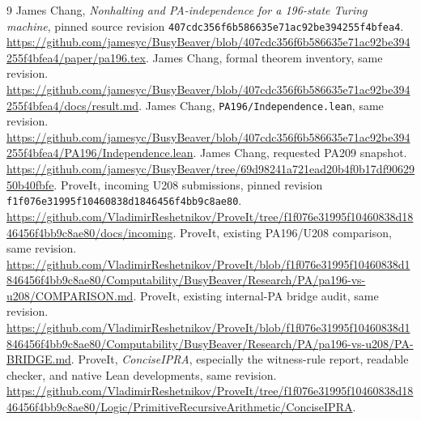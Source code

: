 \documentclass[11pt,letterpaper]{article}
\newcommand{\file}[1]{\texttt{\nolinkurl{#1}}}
\begin{document}
\begin{thebibliography}{9}
 James Chang, \emph{Nonhalting and PA-independence for a
196-state Turing machine}, pinned source revision
\file{407cdc356f6b586635e71ac92be394255f4bfea4}.
\url{https://github.com/jamesyc/BusyBeaver/blob/407cdc356f6b586635e71ac92be394255f4bfea4/paper/pa196.tex}.
 James Chang, formal theorem inventory, same revision.
\url{https://github.com/jamesyc/BusyBeaver/blob/407cdc356f6b586635e71ac92be394255f4bfea4/docs/result.md}.
 James Chang, \file{PA196/Independence.lean}, same revision.
\url{https://github.com/jamesyc/BusyBeaver/blob/407cdc356f6b586635e71ac92be394255f4bfea4/PA196/Independence.lean}.
 James Chang, requested PA209 snapshot.
\url{https://github.com/jamesyc/BusyBeaver/tree/69d98241a721ead20b4f0b17df9062950b40fbfe}.
 ProveIt, incoming U208 submissions, pinned revision
\file{f1f076e31995f10460838d1846456f4bb9c8ae80}.
\url{https://github.com/VladimirReshetnikov/ProveIt/tree/f1f076e31995f10460838d1846456f4bb9c8ae80/docs/incoming}.
 ProveIt, existing PA196/U208 comparison, same revision.
\url{https://github.com/VladimirReshetnikov/ProveIt/blob/f1f076e31995f10460838d1846456f4bb9c8ae80/Computability/BusyBeaver/Research/PA/pa196-vs-u208/COMPARISON.md}.
 ProveIt, existing internal-PA bridge audit, same revision.
\url{https://github.com/VladimirReshetnikov/ProveIt/blob/f1f076e31995f10460838d1846456f4bb9c8ae80/Computability/BusyBeaver/Research/PA/pa196-vs-u208/PA-BRIDGE.md}.
 ProveIt, \emph{ConciseIPRA}, especially the witness-rule
report, readable checker, and native Lean developments, same revision.
\url{https://github.com/VladimirReshetnikov/ProveIt/tree/f1f076e31995f10460838d1846456f4bb9c8ae80/Logic/PrimitiveRecursiveArithmetic/ConciseIPRA}.
\end{thebibliography}
\end{document}
